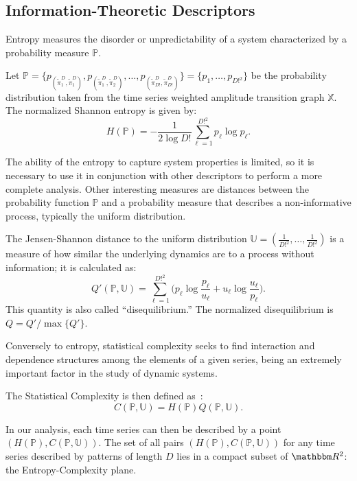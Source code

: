 \documentclass[paper=letter, fontsize=12pt]{article}
\begin{document}
	\subsection{Information-Theoretic Descriptors}\label{HC}
	
	Entropy measures the disorder or unpredictability of a system characterized by a probability measure $\mathbb{P}$.
	
	Let $\mathbb{P} = \{p_{(\widetilde\pi^D_1, \widetilde\pi^D_1)}, p_{(\widetilde\pi^D_1, \widetilde\pi^D_2)}, \dots, p_{(\widetilde\pi^D_{D!}, \widetilde\pi^D_{D!})} \} = \{p_1,\dots,p_{D!^2}\}$ be the probability distribution taken from the time series weighted amplitude transition graph $\mathbb{X}$.
	The normalized Shannon entropy is given by:	
	\begin{equation}
	H(\mathbb{P}) = -\frac1{2\log D!}\sum_{\ell=1}^{D!^2} p_{\ell} \log p_{\ell} .
	\label{eq:Entropia}
	\end{equation}
	
	The ability of the entropy to capture system properties is limited, so it is necessary to use it in conjunction with other des\-criptors to perform a more complete analysis.
	Other interesting measures are distances between the probability function $\mathbb{P}$ and a probability measure that describes a non-informative process, typically the uniform distribution.
	
	The Jensen-Shannon distance to the uniform distribution $\mathbb{U} = (\frac{1}{D!^2}, \dots, \frac{1}{D!^2})$ is a measure of how similar the underlying dynamics are to a process without information; it is calculated as:
	\begin{equation}
	Q'(\mathbb{P}, \mathbb{U}) = \sum_{\ell=1}^{D!^2} \Big(p_\ell \log\frac{p_\ell}{u_\ell} +
	u_\ell \log\frac{u_\ell}{p_\ell}
	\Big).
	\end{equation}
	This quantity is also called ``disequilibrium.''
	The normalized disequilibrium is $ Q=Q'/\max\{Q'\}$.
	
	Conversely to entropy, statistical complexity seeks to find interaction and dependence structures among the elements of a given series, being an extremely important factor in the study of dynamic systems.
	
	The Statistical Complexity is then defined as~\cite{Lamberti2004}:
	\begin{equation}
	C(\mathbb{P}, \mathbb{U}) = H(\mathbb{P}) Q(\mathbb{P}, \mathbb{U}).
	\end{equation}
	
	In our analysis, each time series can then be described by a point $(H(\mathbb{P}), C(\mathbb{P}, \mathbb{U}))$.
	The set of all pairs $(H(\mathbb{P}), C(\mathbb{P}, \mathbb{U}))$ for any time series described by patterns of length $D$ lies in a compact subset of $\mathbbm R^2$: the Entropy-Complexity plane. 
	
\end{document}
